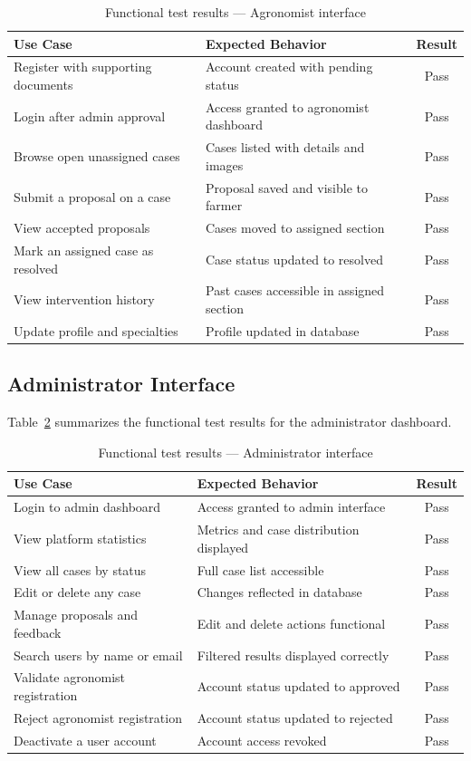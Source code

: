 \begin{table}[H]
\centering
\caption{Functional test results — Agronomist interface}
\label{tab:agronomist-tests}
\begin{tabular}{p{6cm} p{5.5cm} c}
\toprule
\textbf{Use Case} & \textbf{Expected Behavior} & \textbf{Result} \\
\midrule
Register with supporting documents & Account created with pending status & Pass \\
Login after admin approval & Access granted to agronomist dashboard & Pass \\
Browse open unassigned cases & Cases listed with details and images & Pass \\
Submit a proposal on a case & Proposal saved and visible to farmer & Pass \\
View accepted proposals & Cases moved to assigned section & Pass \\
Mark an assigned case as resolved & Case status updated to resolved & Pass \\
View intervention history & Past cases accessible in assigned section & Pass \\
Update profile and specialties & Profile updated in database & Pass \\
\bottomrule
\end{tabular}
\end{table}

\subsection{Administrator Interface}

Table~\ref{tab:admin-tests} summarizes the functional test results for the administrator dashboard.

\begin{table}[H]
\centering
\caption{Functional test results — Administrator interface}
\label{tab:admin-tests}
\begin{tabular}{p{6cm} p{5.5cm} c}
\toprule
\textbf{Use Case} & \textbf{Expected Behavior} & \textbf{Result} \\
\midrule
Login to admin dashboard & Access granted to admin interface & Pass \\
View platform statistics & Metrics and case distribution displayed & Pass \\
View all cases by status & Full case list accessible & Pass \\
Edit or delete any case & Changes reflected in database & Pass \\
Manage proposals and feedback & Edit and delete actions functional & Pass \\
Search users by name or email & Filtered results displayed correctly & Pass \\
Validate agronomist registration & Account status updated to approved & Pass \\
Reject agronomist registration & Account status updated to rejected & Pass \\
Deactivate a user account & Account access revoked & Pass \\
\bottomrule
\end{tabular}
\end{table}


